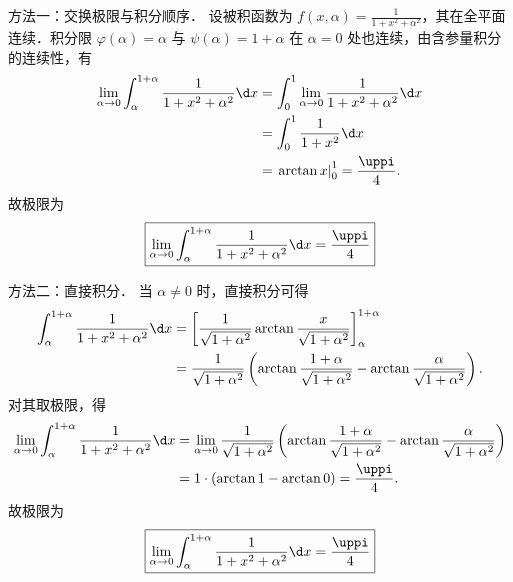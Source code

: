 \begin{solution}

    方法一：交换极限与积分顺序．
    设被积函数为 $f(x, \alpha) = \frac{1}{1 + x^2 + \alpha^2}$，其在全平面连续．积分限 $\varphi(\alpha) = \alpha$ 与 $\psi(\alpha) = 1 + \alpha$ 在 $\alpha = 0$ 处也连续，由含参量积分的连续性，有
    \begin{equation}
        \begin{aligned}
            \lim_{\alpha \to 0} \int_{\alpha}^{1+\alpha} \frac{1}{1 + x^2 + \alpha^2} \d x & = \int_{0}^{1} \lim_{\alpha \to 0} \frac{1}{1 + x^2 + \alpha^2} \d x \\
                                                                                           & = \int_{0}^{1} \frac{1}{1 + x^2} \d x                                \\
                                                                                           & = \left. \arctan x \right|_{0}^{1} = \frac{\uppi}{4}.
        \end{aligned}
    \end{equation}
    故极限为
    \begin{equation}
        \boxed{\lim_{\alpha \to 0} \int_{\alpha}^{1+\alpha} \frac{1}{1 + x^2 + \alpha^2} \d x = \frac{\uppi}{4}}
    \end{equation}

    方法二：直接积分．
    当 $\alpha \neq 0$ 时，直接积分可得
    \begin{equation}
        \begin{aligned}
            \int_{\alpha}^{1+\alpha} \frac{1}{1 + x^2 + \alpha^2} \d x & = \left[ \frac{1}{\sqrt{1 + \alpha^2}} \arctan \frac{x}{\sqrt{1 + \alpha^2}} \right]_{\alpha}^{1+\alpha}                              \\
                                                                       & = \frac{1}{\sqrt{1 + \alpha^2}} \left( \arctan \frac{1+\alpha}{\sqrt{1+\alpha^2}} - \arctan \frac{\alpha}{\sqrt{1+\alpha^2}} \right).
        \end{aligned}
    \end{equation}
    对其取极限，得
    \begin{equation}
        \begin{aligned}
            \lim_{\alpha \to 0} \int_{\alpha}^{1+\alpha} \frac{1}{1 + x^2 + \alpha^2} \d x & = \lim_{\alpha \to 0} \frac{1}{\sqrt{1 + \alpha^2}} \left( \arctan \frac{1+\alpha}{\sqrt{1+\alpha^2}} - \arctan \frac{\alpha}{\sqrt{1+\alpha^2}} \right) \\
                                                                                           & = 1 \cdot \left( \arctan 1 - \arctan 0 \right) = \frac{\uppi}{4}.
        \end{aligned}
    \end{equation}
    故极限为
    \begin{equation}
        \boxed{\lim_{\alpha \to 0} \int_{\alpha}^{1+\alpha} \frac{1}{1 + x^2 + \alpha^2} \d x = \frac{\uppi}{4}}
    \end{equation}
\end{solution}

